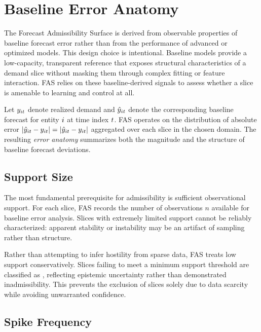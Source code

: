 
\section{Baseline Error Anatomy}
\label{sec:fas_baseline_error_anatomy}

The Forecast Admissibility Surface is derived from observable properties of
baseline forecast error rather than from the performance of advanced or
optimized models. This design choice is intentional. Baseline models provide a
low-capacity, transparent reference that exposes structural characteristics of
a demand slice without masking them through complex fitting or feature
interaction. FAS relies on these baseline-derived signals to assess whether a
slice is amenable to learning and control at all.

Let $y_{it}$ denote realized demand and $\hat{y}_{it}$ denote the corresponding baseline
forecast for entity $i$ at time index $t$. FAS operates on the
distribution of absolute error
$\left|\hat{y}_{it} - y_{it}\right| = \left|\hat{y}_{it} - y_{it}\right|$ aggregated over each slice in the chosen
domain. The resulting \emph{error anatomy} summarizes both the magnitude and the
structure of baseline forecast deviations.

\subsection{Support Size}

The most fundamental prerequisite for admissibility is sufficient observational
support. For each slice, FAS records the number of observations $n$ available for
baseline error analysis. Slices with extremely limited support cannot be
reliably characterized: apparent stability or instability may be an artifact of
sampling rather than structure.

Rather than attempting to infer hostility from sparse data, FAS treats low
support conservatively. Slices failing to meet a minimum support threshold are
classified as \Conditional, reflecting epistemic uncertainty rather than
demonstrated inadmissibility. This prevents the exclusion of slices solely due to
data scarcity while avoiding unwarranted confidence.

\subsection{Spike Frequency}

